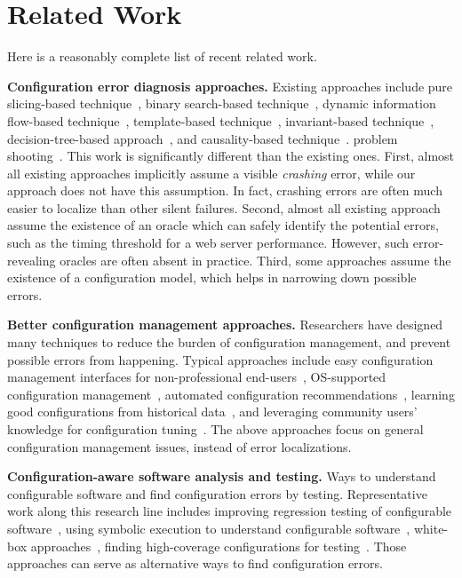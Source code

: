 \section{Related Work}

Here is a reasonably complete list of recent related work.

\textbf{Configuration error diagnosis approaches.} Existing approaches include
pure slicing-based technique~\cite{Rabkin:2011:PPC}, binary search-based
technique~\cite{Whitaker:2004:CDS}, dynamic information flow-based
technique~\cite{Attariyan:2010:ACT}, template-based technique~\cite{Yuan:2011:COC},
invariant-based technique~\cite{Zhou:2007:DMD}, decision-tree-based approach~\cite{Mickens:2007:SID}, and
causality-based technique~\cite{Attariyan:2008:UCD}.
problem shooting~\cite{Su:2009:AGP, Wang:2004:AMT}. 
This work is significantly different than the existing ones. First,
almost all existing approaches implicitly assume a visible \textit{crashing} error,
while our approach does not have this assumption. In fact, crashing
errors are often much easier to localize than other silent failures.
Second, almost all existing approach assume the existence of an oracle
which can safely identify the potential errors, such as the timing
threshold for a web server performance. However, such error-revealing
oracles are often absent in practice.
Third, some approaches assume the existence of a configuration model, which
helps in narrowing down possible errors.

\textbf{Better configuration management approaches.} Researchers
have designed many techniques to reduce the burden of configuration
management, and prevent possible errors from happening. Typical
approaches include easy configuration management interfaces
for non-professional end-users~\cite{Kushman:2010:ECA},
OS-supported configuration management~\cite{Su:2007:AIC},
automated configuration recommendations~\cite{Zheng:2007:ACI},
learning good configurations from historical data~\cite{Rao:2009:VRL}, and
leveraging community users' knowledge for configuration tuning~\cite{Zheng:2011:MAC}.
The above approaches focus on general configuration management issues, instead
of error localizations.


\textbf{Configuration-aware software analysis and testing.} Ways to understand
configurable software and find configuration errors by testing. Representative work along this
research line includes improving regression testing of configurable software~\cite{Qu:2008:CRT},
using symbolic execution to understand configurable software~\cite{Reisner:2010:USE},
white-box approaches~\cite{whiteboxconf},
finding high-coverage configurations for testing~\cite{itrees}. Those approaches
can serve as alternative ways to find configuration errors.


